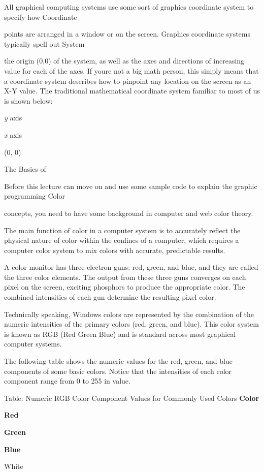\documentclass[
]{article}
\begin{document}
All graphical computing systems use some sort of graphics coordinate
system to specify how Coordinate

points are arranged in a window or on the screen. Graphics coordinate
systems typically spell out System

the origin (0,0) of the system, as well as the axes and directions of
increasing value for each of the axes. If you\textquotesingle re not a
big math person, this simply means that a coordinate system describes
how to pinpoint any location on the screen as an X-Y value. The
traditional mathematical coordinate system familiar to most of us is
shown below:

\emph{y} axis

\emph{x} axis

(0, 0)

The Basics of

Before this lecture can move on and use some sample code to explain the
graphic programming Color

concepts, you need to have some background in computer and web color
theory.

The main function of color in a computer system is to accurately reflect
the physical nature of color within the confines of a computer, which
requires a computer color system to mix colors with accurate,
predictable results.

A color monitor has three electron guns: red, green, and blue, and they
are called the three color elements. The output from these three guns
converges on each pixel on the screen, exciting phosphors to produce the
appropriate color. The combined intensities of each gun determine the
resulting pixel color.

Technically speaking, Windows colors are represented by the combination
of the numeric intensities of the primary colors (red, green, and blue).
This color system is known as RGB (Red Green Blue) and is standard
across most graphical computer systems.

The following table shows the numeric values for the red, green, and
blue components of some basic colors. Notice that the intensities of
each color component range from 0 to 255 in value.

Table: Numeric RGB Color Component Values for Commonly Used Colors
\textbf{Color}

\textbf{Red}

\textbf{Green}

\textbf{Blue}

White
\end{document}
